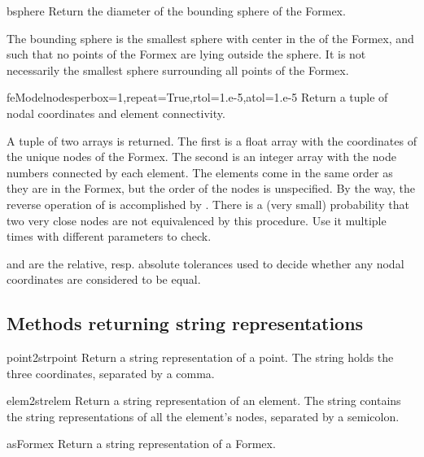 {{\begin{methoddesc}{bsphere}{}
Return the diameter of the bounding sphere of the Formex.

The bounding sphere is the smallest sphere with center in the  of the Formex, and such that no points of the Formex are lying outside the sphere. It is not necessarily the smallest sphere surrounding all points of the Formex.
\end{methoddesc}

\begin{methoddesc}{feModel}{nodesperbox=1,repeat=True,rtol=1.e-5,atol=1.e-5}
Return a tuple of nodal coordinates and element connectivity.

A tuple of two arrays is returned. The first is a float array with the coordinates of the unique nodes of the Formex. The second is an integer array with the node numbers connected by each element. The elements come in the same order as they are in the Formex, but the order of the nodes is unspecified. By the way, the reverse operation of
 is accomplished by . There is a (very small) probability that two very close nodes are not equivalenced by this procedure. Use it multiple times with different parameters to check.

 and  are the relative, resp. absolute tolerances used to decide whether any nodal coordinates are considered to be equal. 
\end{methoddesc}


\subsection{Methods returning string representations}

\begin{methoddesc}{point2str}{point}
Return a string representation of a point. The string holds the three coordinates, separated by a comma. \classmethod
\end{methoddesc}

\begin{methoddesc}{elem2str}{elem}
Return a string representation of an element. The string contains the string representations of all the element's nodes, separated by a semicolon. \classmethod
\end{methoddesc}
    
\begin{methoddesc}{asFormex}{}
Return a string representation of a Formex.


\end{methoddesc}}}
